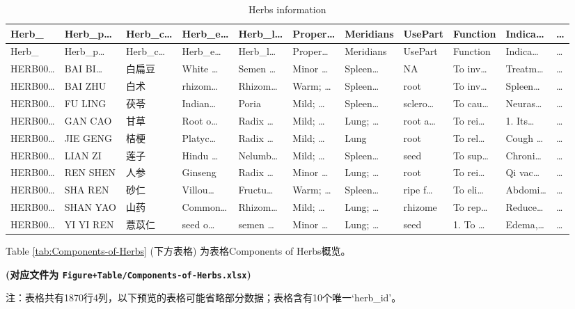 \documentclass[
]{article}
\begin{document}
\begin{longtable}[]{@{}lllllllllll@{}}
\caption{\label{tab:Herbs-information}Herbs information}\tabularnewline
\toprule
Herb\_ & Herb\_p\ldots{} & Herb\_c\ldots{} & Herb\_e\ldots{} & Herb\_l\ldots{} & Proper\ldots{} & Meridians & UsePart & Function & Indica\ldots{} & \ldots{}\tabularnewline
\midrule
\endfirsthead
\toprule
Herb\_ & Herb\_p\ldots{} & Herb\_c\ldots{} & Herb\_e\ldots{} & Herb\_l\ldots{} & Proper\ldots{} & Meridians & UsePart & Function & Indica\ldots{} & \ldots{}\tabularnewline
\midrule
\endhead
HERB00\ldots{} & BAI BI\ldots{} & 白扁豆 & White \ldots{} & Semen \ldots{} & Minor \ldots{} & Spleen\ldots{} & NA & To inv\ldots{} & Treatm\ldots{} & \ldots{}\tabularnewline
HERB00\ldots{} & BAI ZHU & 白术 & rhizom\ldots{} & Rhizom\ldots{} & Warm; \ldots{} & Spleen\ldots{} & root & To inv\ldots{} & Spleen\ldots{} & \ldots{}\tabularnewline
HERB00\ldots{} & FU LING & 茯苓 & Indian\ldots{} & Poria & Mild; \ldots{} & Spleen\ldots{} & sclero\ldots{} & To cau\ldots{} & Neuras\ldots{} & \ldots{}\tabularnewline
HERB00\ldots{} & GAN CAO & 甘草 & Root o\ldots{} & Radix \ldots{} & Mild; \ldots{} & Lung; \ldots{} & root a\ldots{} & To rei\ldots{} & 1. Its\ldots{} & \ldots{}\tabularnewline
HERB00\ldots{} & JIE GENG & 桔梗 & Platyc\ldots{} & Radix \ldots{} & Mild; \ldots{} & Lung & root & To rel\ldots{} & Cough \ldots{} & \ldots{}\tabularnewline
HERB00\ldots{} & LIAN ZI & 莲子 & Hindu \ldots{} & Nelumb\ldots{} & Mild; \ldots{} & Spleen\ldots{} & seed & To sup\ldots{} & Chroni\ldots{} & \ldots{}\tabularnewline
HERB00\ldots{} & REN SHEN & 人参 & Ginseng & Radix \ldots{} & Minor \ldots{} & Lung; \ldots{} & root & To rei\ldots{} & Qi vac\ldots{} & \ldots{}\tabularnewline
HERB00\ldots{} & SHA REN & 砂仁 & Villou\ldots{} & Fructu\ldots{} & Warm; \ldots{} & Spleen\ldots{} & ripe f\ldots{} & To eli\ldots{} & Abdomi\ldots{} & \ldots{}\tabularnewline
HERB00\ldots{} & SHAN YAO & 山药 & Common\ldots{} & Rhizom\ldots{} & Mild; \ldots{} & Lung; \ldots{} & rhizome & To rep\ldots{} & Reduce\ldots{} & \ldots{}\tabularnewline
HERB00\ldots{} & YI YI REN & 薏苡仁 & seed o\ldots{} & semen \ldots{} & Minor \ldots{} & Lung; \ldots{} & seed & 1. To \ldots{} & Edema,\ldots{} & \ldots{}\tabularnewline
\bottomrule
\end{longtable}

Table \ref{tab:Components-of-Herbs} (下方表格) 为表格Components of Herbs概览。

\textbf{(对应文件为 \texttt{Figure+Table/Components-of-Herbs.xlsx})}

\begin{center}\begin{tcolorbox}[colback=gray!10, colframe=gray!50, width=0.9\linewidth, arc=1mm, boxrule=0.5pt]注：表格共有1870行4列，以下预览的表格可能省略部分数据；表格含有10个唯一`herb\_id'。
\end{tcolorbox}
\end{center}
\end{document}
